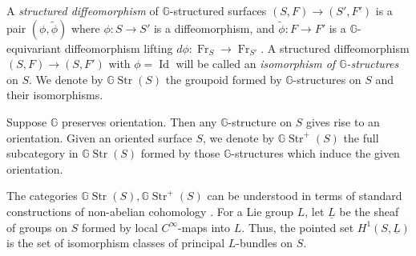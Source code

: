 \documentclass[english,11pt,leqno]{article}
\def\GG{\mathbb{G}}
\def\Id{\operatorname{Id}\nolimits}
\def\on{\operatorname}
\def\Fr{\on{Fr}}
\def\Gstr{\GG\on{Str}}
\def\Homeo{{ \on{Homeo}}}
\theoremstyle{definition}
\theoremstyle{remark}
\newtheorem{rem}[thm]{Remark}
\numberwithin{equation}{section}
\begin{document}

A {\em structured diffeomorphism} of $\GG$-structured surfaces $(S,F)\to (S', F')$ is a pair
$(\phi,\widetilde \phi)$ where $\phi: S\to S'$ is a diffeomorphism, and $\widetilde\phi: F\to F'$
is a $\GG$-equivariant diffeomorphism lifting $d\phi: \Fr_S\to\Fr_{S'}$. A structured diffeomorphism
$(S,F) \to (S,F')$ with $\phi=\Id$ will be called an {\em isomorphism of $\GG$-structures} on $S$. 
We denote by $\Gstr(S)$ the groupoid formed by $\GG$-structures on $S$ and their isomorphisms.

Suppose $\GG$ preserves orientation. Then any $\GG$-structure on $S$ gives rise to an orientation.
Given an oriented surface $S$, we denote by $\Gstr^+(S)$ the full subcategory in $\Gstr(S)$ formed
by those $\GG$-structures which induce the given orientation. 

The categories $\Gstr(S), \Gstr^+(S)$ can be understood in terms of standard constructions of
non-abelian cohomology \cite{giraud}. For a Lie group $L$, let $\underline {L}$ be the sheaf of
groups on $S$ formed by local $C^\infty$-maps into $L$. Thus, the pointed set $H^1(S,\underline L)$ is the set of
isomorphism classes of principal $L$-bundles on $S$. 
\end{document}
